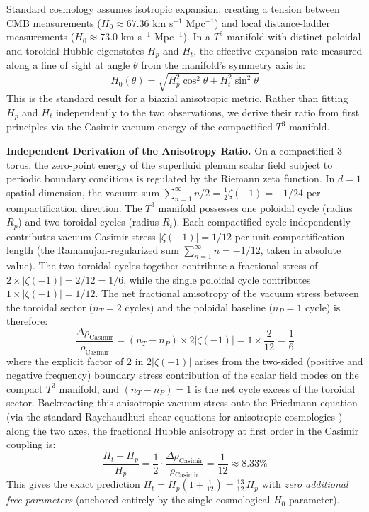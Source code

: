 \documentclass[aps,prd,10pt,twocolumn,superscriptaddress,nofootinbib,floatfix]{revtex4-2}
\begin{document}
Standard cosmology assumes isotropic expansion, creating a tension between CMB measurements ($H_0 \approx 67.36$ km s$^{-1}$ Mpc$^{-1}$) and local distance-ladder measurements ($H_0 \approx 73.0$ km s$^{-1}$ Mpc$^{-1}$). In a $T^3$ manifold with distinct poloidal and toroidal Hubble eigenstates $H_p$ and $H_t$, the effective expansion rate measured along a line of sight at angle $\theta$ from the manifold's symmetry axis is:
\begin{equation}
H_0(\theta) = \sqrt{H_p^2\cos^2\theta + H_t^2\sin^2\theta}
\end{equation}
This is the standard result for a biaxial anisotropic metric. Rather than fitting $H_p$ and $H_t$ independently to the two observations, we derive their ratio from first principles via the Casimir vacuum energy of the compactified $T^3$ manifold.

\textbf{Independent Derivation of the Anisotropy Ratio.} On a compactified 3-torus, the zero-point energy of the superfluid plenum scalar field subject to periodic boundary conditions is regulated by the Riemann zeta function. In $d=1$ spatial dimension, the vacuum sum $\sum_{n=1}^\infty n/2 = \frac{1}{2}\zeta(-1) = -1/24$ per compactification direction. The $T^3$ manifold possesses one poloidal cycle (radius $R_p$) and two toroidal cycles (radius $R_t$). Each compactified cycle independently contributes vacuum Casimir stress $|\zeta(-1)| = 1/12$ per unit compactification length (the Ramanujan-regularized sum $\sum_{n=1}^\infty n = -1/12$, taken in absolute value). The two toroidal cycles together contribute a fractional stress of $2 \times |\zeta(-1)| = 2/12 = 1/6$, while the single poloidal cycle contributes $1 \times |\zeta(-1)| = 1/12$. The net fractional anisotropy of the vacuum stress between the toroidal sector ($n_T = 2$ cycles) and the poloidal baseline ($n_P = 1$ cycle) is therefore:
\begin{equation}
\frac{\Delta \rho_{\text{Casimir}}}{\rho_{\text{Casimir}}} = (n_T - n_P) \times 2\left|\zeta(-1)\right| = 1 \times \frac{2}{12} = \frac{1}{6}
\end{equation}
where the explicit factor of 2 in $2|\zeta(-1)|$ arises from the two-sided (positive and negative frequency) boundary stress contribution of the scalar field modes on the compact $T^3$ manifold, and $(n_T - n_P) = 1$ is the net cycle excess of the toroidal sector.
Backreacting this anisotropic vacuum stress onto the Friedmann equation (via the standard Raychaudhuri shear equations for anisotropic cosmologies \cite{misner_gravitation, ellis_maccallum}) along the two axes, the fractional Hubble anisotropy at first order in the Casimir coupling is:
\begin{equation}\label{eq:casimir_ratio}
\frac{H_t - H_p}{H_p} = \frac{1}{2} \cdot \frac{\Delta \rho_{\text{Casimir}}}{\rho_{\text{Casimir}}} = \frac{1}{12} \approx 8.33\%
\end{equation}
This gives the exact prediction $H_t = H_p\left(1 + \frac{1}{12}\right) = \frac{13}{12}\,H_p$ with \emph{zero additional free parameters} (anchored entirely by the single cosmological $H_0$ parameter).
\end{document}
